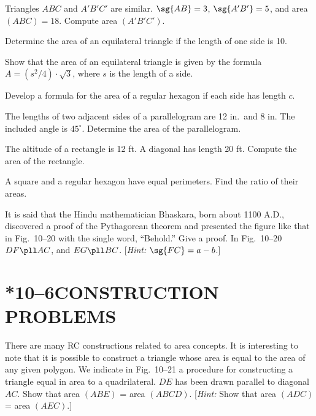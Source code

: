 \documentclass[11pt]{book}
\theoremstyle{bkplain}
\theoremstyle{XIplainnote}
\theoremstyle{bkplain}
\theoremstyle{bkplain}
\begin{document}
\begin{exercisecols}
\begin{exlist}
\item Triangles $ABC$ and $A'B'C'$ are similar. $\sg{AB} = 3$,
  $\sg{A'B'} = 5$, and area $(ABC) = 18$. Compute area $(A'B'C')$.
\item Determine the area of an equilateral triangle if the length of one side
  is 10.
\item Show that the area of an equilateral triangle is given by the formula
  $A = (s^2/4) \cdot \sqrt{3}$, where $s$ is the length of a side.
\item Develop a formula for the area of a regular hexagon if each side has
  length $c$.
\item The lengths of two adjacent sides of a parallelogram are 12 in.\ and
  8 in. The included angle is $45^\circ$. Determine the area of the
  parallelogram.
\item The altitude of a rectangle is 12 ft. A diagonal has length 20 ft.
  Compute the area of the rectangle.
\item[\stex 7.] A square and a regular hexagon have equal perimeters. Find the
  ratio of their areas.
\item[\stex 8.] It is said that the Hindu mathematician Bhaskara, born about
  1100 A.D., discovered a proof of the Pythagorean theorem and presented the
  figure like that in Fig.~10--20 with the single word, ``Behold.'' Give a
  proof. In Fig.~10--20 $DF \pll AC$, and $EG \pll BC$.
  [\emph{Hint:} $\sg{FC} = a - b$.]
\exfig{\FIGXTWENTY}
\end{exlist}
\end{exercisecols}

\section*{*10--6\quad CONSTRUCTION PROBLEMS}

There are many RC constructions related to area concepts. It is interesting to
note that it is possible to construct a triangle whose area is equal to the
area of any given polygon. We indicate in Fig.~10--21 a procedure for
constructing a triangle equal in area to a quadrilateral. $DE$ has been drawn
parallel to diagonal $AC$. Show that area $(ABE)$ = area $(ABCD)$.
[\emph{Hint:} Show that area $(ADC)$ = area $(AEC)$.]
\end{document}
